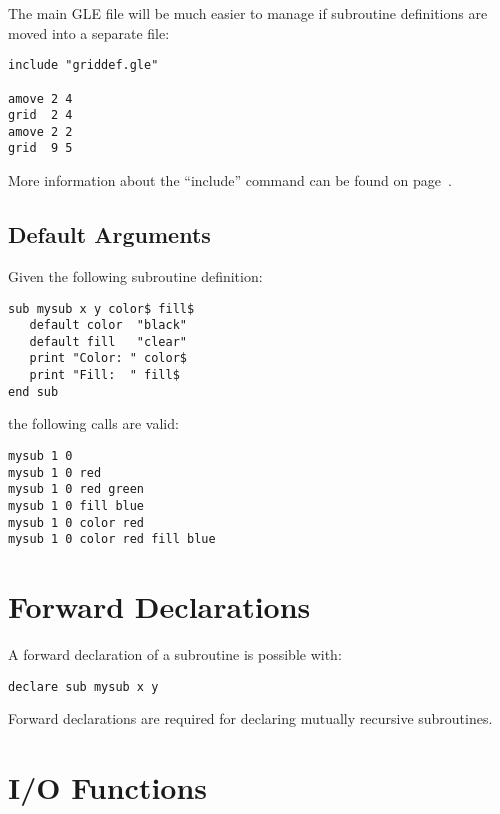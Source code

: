 The main GLE file will be much easier to manage if subroutine definitions are moved into a separate file:

\preglecode{}
\begin{Verbatim}
include "griddef.gle"

amove 2 4
grid  2 4
amove 2 2
grid  9 5
\end{Verbatim}
\postglecode{}

More information about the ``include'' command can be found on page~\pageref{incl:cmnd}.

\subsection{Default Arguments}

Given the following subroutine definition:

\preglecode{}
\begin{Verbatim}
sub mysub x y color$ fill$
   default color  "black"
   default fill   "clear"
   print "Color: " color$
   print "Fill:  " fill$
end sub
\end{Verbatim}
\postglecode{}

\noindent{}the following calls are valid:

\preglecode{}
\begin{Verbatim}
mysub 1 0
mysub 1 0 red
mysub 1 0 red green
mysub 1 0 fill blue
mysub 1 0 color red
mysub 1 0 color red fill blue
\end{Verbatim}
\postglecode{}

\section{Forward Declarations}

A forward declaration of a subroutine is possible with:

\preglecode{}
\begin{Verbatim}
declare sub mysub x y
\end{Verbatim}
\postglecode{}

\noindent{}Forward declarations are required for declaring mutually recursive subroutines.

\section{I/O Functions}
  
  
 

